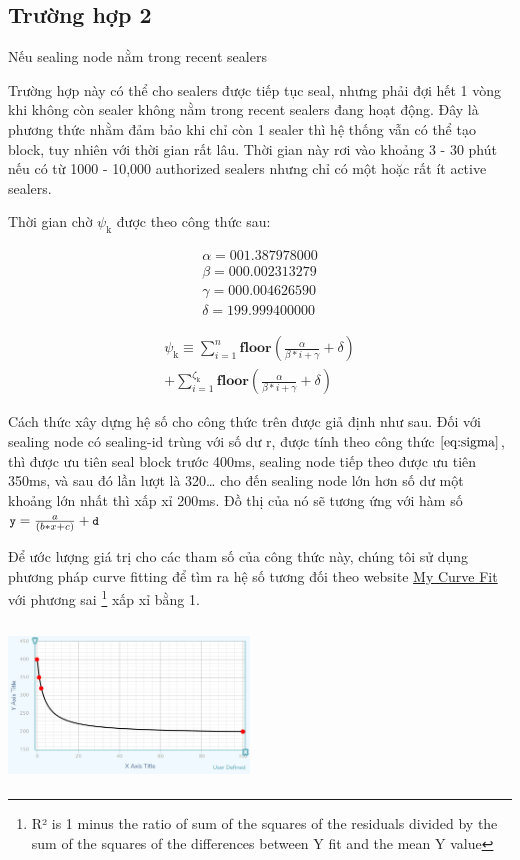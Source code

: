 \documentclass[12pt]{amsart}
\begin{document}
\begin{multicols}{2}
\subsection{Trường hợp 2} Nếu sealing node nằm trong recent sealers

Trường hợp này có thể cho sealers được tiếp tục seal, nhưng phải đợi hết 1 vòng khi không còn sealer không nằm trong recent sealers đang hoạt động. Đây là phương thức nhằm đảm bảo khi chỉ còn 1 sealer thì hệ thống vẫn có thể tạo block, tuy nhiên với thời gian rất lâu. Thời gian này rơi vào khoảng 3 - 30 phút nếu có từ 1000 - 10,000 authorized sealers nhưng chỉ có một hoặc rất ít active sealers.

Thời gian chờ $\psi_{\mathrm{k}}$ được theo công thức sau:

\begin{eqnarray}
\alpha = 001.387978000 \\
\beta = 000.002313279 \\
\gamma = 000.004626590 \\
\delta = 199.999400000
\end{eqnarray}

\begin{multline}\label{eq:psi_2}
\psi_{\mathrm{k}} \equiv \sum_{i=1}^{n} \mathbf{floor}(\frac{\alpha}{\beta*i+\gamma} + \delta) \\ 
+ \sum_{i=1}^{\zeta_\mathrm{k}} \mathbf{floor}(\frac{\alpha}{\beta*i+\gamma} + \delta)
\end{multline}

Cách thức xây dựng hệ số cho công thức trên được giả định như sau. Đối với sealing node có sealing-id trùng với số dư r, được tính theo công thức $\eqref{eq:sigma}$, thì được ưu tiên seal block trước 400ms, sealing node tiếp theo được ưu tiên 350ms, và sau đó lần lượt là 320… cho đến sealing node lớn hơn số dư một khoảng lớn nhất thì xấp xỉ 200ms. Đồ thị của nó sẽ tương ứng với hàm số $\texttt{\small y} = \frac{a} {(b * x + c)} + \texttt{\small d}$

Để ước lượng giá trị cho các tham số của công thức này, chúng tôi sử dụng phương pháp curve fitting để tìm ra hệ số tương đối theo website \href{https://mycurvefit.com/}{My Curve Fit} với phương sai \footnote{R² is 1 minus the ratio of sum of the squares of the residuals divided by the sum of the squares of the differences between Y fit and the mean Y value} xấp xỉ bằng 1.
\\
\\
\includegraphics[width=0.48\textwidth, height=4cm]{curve-fit}
\\






\end{multicols}
\end{document}
